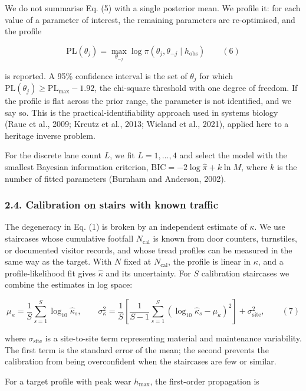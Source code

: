 \documentclass[
]{article}
\begin{document}
We do not summarise Eq. (5) with a single posterior mean. We profile it:
for each value of a parameter of interest, the remaining parameters are
re-optimised, and the profile

\[
\mathrm{PL}(\theta_j)=\max_{\theta_{-j}}\log\pi(\theta_j,\theta_{-j}\mid h_{\mathrm{obs}})
\qquad (6)
\]

is reported. A 95\% confidence interval is the set of \(\theta_j\) for
which \(\mathrm{PL}(\theta_j)\ge \mathrm{PL}_{\max}-1.92\), the
chi-square threshold with one degree of freedom. If the profile is flat
across the prior range, the parameter is not identified, and we say so.
This is the practical-identifiability approach used in systems biology
(Raue et al., 2009; Kreutz et al., 2013; Wieland et al., 2021), applied
here to a heritage inverse problem.

For the discrete lane count \(L\), we fit \(L=1,\ldots,4\) and select
the model with the smallest Bayesian information criterion,
\(\mathrm{BIC}=-2\log\hat{\pi}+k\ln M\), where \(k\) is the number of
fitted parameters (Burnham and Anderson, 2002).

\subsubsection{2.4. Calibration on stairs with known
traffic}\label{calibration-on-stairs-with-known-traffic}

The degeneracy in Eq. (1) is broken by an independent estimate of
\(\kappa\). We use staircases whose cumulative footfall
\(N_{\mathrm{cal}}\) is known from door counters, turnstiles, or
documented visitor records, and whose tread profiles can be measured in
the same way as the target. With \(N\) fixed at \(N_{\mathrm{cal}}\),
the profile is linear in \(\kappa\), and a profile-likelihood fit gives
\(\hat\kappa\) and its uncertainty. For \(S\) calibration staircases we
combine the estimates in log space:

\[
\mu_\kappa=\frac{1}{S}\sum_{s=1}^{S}\log_{10}\hat\kappa_s,
\qquad
\sigma_\kappa^2=\frac{1}{S}\left[\frac{1}{S-1}\sum_{s=1}^{S}\left(\log_{10}\hat\kappa_s-\mu_\kappa\right)^2\right]+\sigma_{\mathrm{site}}^2,
\qquad (7)
\]

where \(\sigma_{\mathrm{site}}\) is a site-to-site term representing
material and maintenance variability. The first term is the standard
error of the mean; the second prevents the calibration from being
overconfident when the staircases are few or similar.

For a target profile with peak wear \(h_{\max}\), the first-order
propagation is
\end{document}
